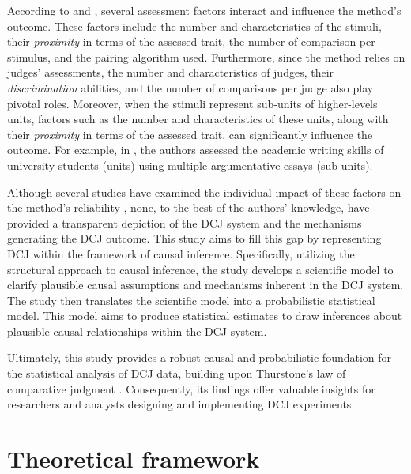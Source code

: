 \documentclass[
  authoryear,
  preprint,
  1p]{elsarticle}
\begin{document}
According to \citet{Verhavert_et_al_2019} and \citet{vanDaal_2020},
several assessment factors interact and influence the method's outcome.
These factors include the number and characteristics of the stimuli,
their \emph{proximity} in terms of the assessed trait, the number of
comparison per stimulus, and the pairing algorithm used. Furthermore,
since the method relies on judges' assessments, the number and
characteristics of judges, their \emph{discrimination} abilities, and
the number of comparisons per judge also play pivotal roles. Moreover,
when the stimuli represent sub-units of higher-levels units, factors
such as the number and characteristics of these units, along with their
\emph{proximity} in terms of the assessed trait, can significantly
influence the outcome. For example, in \citet{vanDaal_et_al_2016}, the
authors assessed the academic writing skills of university students
(units) using multiple argumentative essays (sub-units).

Although several studies have examined the individual impact of these
factors on the method's reliability
\citep{Bramley_2015, Pollitt_2012b, Bramley_et_al_2019, Verhavert_et_al_2019, Crompvoets_et_al_2022, vanDaal_et_al_2017, Gijsen_et_al_2021, Bouwer_et_al_2023},
none, to the best of the authors' knowledge, have provided a transparent
depiction of the DCJ system and the mechanisms generating the DCJ
outcome. This study aims to fill this gap by representing DCJ within the
framework of causal inference. Specifically, utilizing the structural
approach to causal inference, the study develops a scientific model to
clarify plausible causal assumptions and mechanisms inherent in the DCJ
system. The study then translates the scientific model into a
probabilistic statistical model. This model aims to produce statistical
estimates to draw inferences about plausible causal relationships within
the DCJ system.

Ultimately, this study provides a robust causal and probabilistic
foundation for the statistical analysis of DCJ data, building upon
Thurstone's law of comparative judgment \citeyearpar{Thurstone_1927}.
Consequently, its findings offer valuable insights for researchers and
analysts designing and implementing DCJ experiments.

\section{Theoretical framework}\label{sec-framework}
\end{document}
